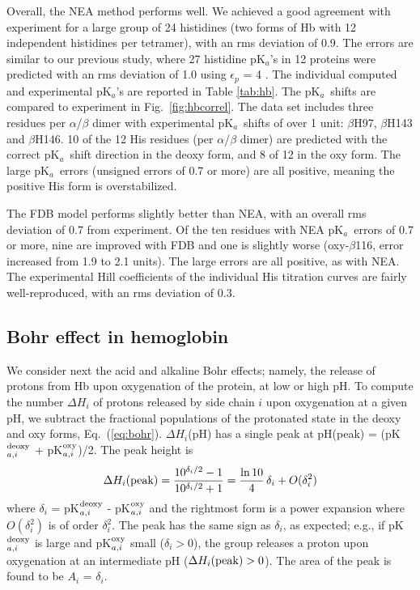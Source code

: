 \documentclass[a4paper,12pt]{article}
\newcommand{\pk}{pK$_a$}
\begin{document}
Overall, the NEA method performs well. We achieved a good agreement with experiment for a large group of
24 histidines (two forms of Hb with 12 independent histidines per tetramer), with an rms deviation of 0.9.
The errors are similar to our previous study, where 27 histidine \pk's in 12 proteins were predicted
with an rms deviation of 1.0 using $\epsilon_p$ = 4 \cite{Polydorides13}. The individual computed and
experimental \pk's are reported in Table \ref{tab:hb}. The \pk\ shifts are compared to experiment in
Fig.\ \ref{fig:hbcorrel}. The data set includes three residues per $\alpha$/$\beta$ dimer with experimental
\pk\ shifts of over 1 unit: $\beta$H97, $\beta$H143 and $\beta$H146. 10 of the 12 His residues (per
$\alpha$/$\beta$ dimer) are predicted with the correct \pk\ shift direction in the deoxy form, and 8 of
12 in the oxy form. The large \pk\ errors (unsigned errors of 0.7 or more) are all positive, meaning the
positive His form is overstabilized. 

The FDB model performs slightly better than NEA, with an overall rms deviation of 0.7 from experiment.
Of the ten residues with NEA \pk\ errors of 0.7 or more, nine are improved with FDB and one is slightly
worse (oxy-$\beta$116, error increased from 1.9 to 2.1 units). The large errors are all positive, as with
NEA. The experimental Hill coefficients of the individual His titration curves are fairly well-reproduced,
with an rms deviation of 0.3.

\subsection{Bohr effect in hemoglobin}
We consider next the acid and alkaline Bohr effects; namely, the release of protons from Hb upon oxygenation
of the protein, at low or high pH. To compute the number $\Delta H_i$ of protons released by side chain $i$
upon oxygenation at a given pH, we subtract the fractional populations of the protonated state in the deoxy
and oxy forms, Eq.\ (\ref{eq:bohr}). $\Delta H_i$(pH) has a single peak at pH(peak) = (pK$_{a,i}^{\rm deoxy}$
+ pK$_{a,i}^{\rm oxy}$)/2. The peak height is
\begin{equation}
\Delta H_i({\rm peak}) = \frac{10^{\delta_i/2}-1}{10^{\delta_i/2}+1} = \frac{\ln10}{4} \, \delta_i  + O(\delta_i^2)
\end{equation} 
where $\delta_i$ = pK$_{a,i}^{\rm deoxy}$ - pK$_{a,i}^{\rm oxy}$ and the rightmost form is a power expansion where
$O(\delta_i^2)$ is of order $\delta_i^2$. The peak has the same sign as $\delta_i$, as expected; e.g., if
pK$_{a,i}^{\rm deoxy}$ is large and pK$_{a,i}^{\rm oxy}$ small ($\delta_i > 0$), the group releases a proton upon
oxygenation at an intermediate pH ($\Delta H_i({\rm peak}) > 0$). The area of the peak is found to be $A_i$
= $\delta_i$. 
\end{document}
